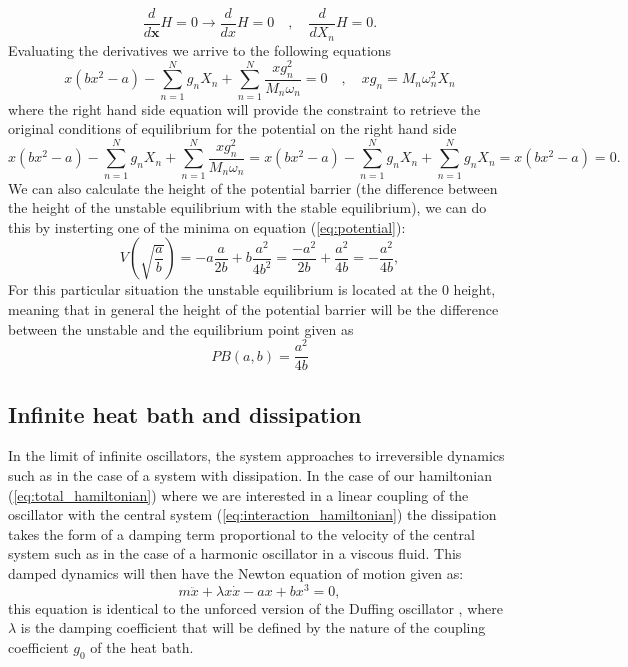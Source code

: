 \begin{equation}
\frac{d}{d\textbf{x}}H=0\rightarrow \frac{d}{dx}H =0 \quad , \quad \frac{d}{dX_n}H  = 0.
\end{equation}
Evaluating the derivatives we arrive to the following equations
\begin{equation}
x(bx^2-a)-\sum_{n=1}^N g_n X_n +\sum_{n=1}^N \frac{xg_n^2}{M_n\omega_n}=0 \quad , \quad xg_n=M_n\omega_n^2 X_n 
\end{equation}
where the right hand side equation will provide the constraint to retrieve the original conditions of equilibrium for the potential on the right hand side
\begin{equation}
x(bx^2-a)-\sum_{n=1}^N g_n X_n +\sum_{n=1}^N \frac{xg_n^2}{M_n\omega_n}= x(bx^2-a)-\sum_{n=1}^N g_n X_n +\sum_{n=1}^N g_n X_n=x(bx^2-a)=0.
\end{equation}
We can also calculate the height of the potential barrier (the difference between the height of the unstable equilibrium with the stable equilibrium), we can do this by insterting one of the minima on equation (\ref{eq:potential}):
\begin{equation}
V(\sqrt{\frac{a}{b}})=-a\frac{a}{2b}+b\frac{a^2}{4b^2}=\frac{-a^2}{2b}+\frac{a^2}{4b}=-\frac{a^2}{4b},
\end{equation}
For this particular situation the unstable equilibrium is located at the $0$ height, meaning that in general the height of the potential barrier will be the difference between the unstable and the equilibrium point given as
\begin{equation}
PB(a,b)=\frac{a^2}{4b}
\label{eq:PB_eq}
\end{equation}



\subsection{Infinite heat bath and dissipation}
In the limit of infinite oscillators, the system approaches to irreversible dynamics such as in the case of a system with dissipation. In the case of our hamiltonian (\ref{eq:total_hamiltonian}) where we are interested in a linear coupling of the oscillator with the central system (\ref{eq:interaction_hamiltonian}) the dissipation takes the form of a damping term proportional to the velocity of the central system such as in the case of a harmonic oscillator in a viscous fluid. This damped dynamics will then have the Newton equation of motion given as:
\begin{equation}
m\ddot{x}+\lambda x\dot{x}-ax+bx^3=0,
\label{eq:newton_damped}
\end{equation}
this equation is identical to the unforced version of the Duffing oscillator \cite{guckenheimer2013nonlinear}, where $\lambda$  is the damping coefficient that will be defined by the nature of the coupling coefficient $g_0$ of the heat bath.


